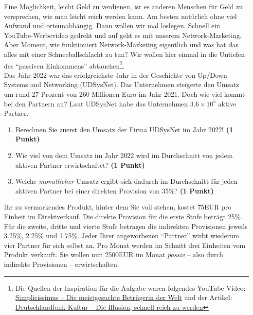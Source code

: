 \documentclass[a4paper, 9pt]{scrartcl}\usepackage[]{graphicx}\usepackage[]{xcolor}
\begin{document}
Eine M{\"o}glichkeit, leicht Geld zu verdienen, ist es anderen Menschen f{\"u}r Geld
zu versprechen, wie man leicht reich werden kann. Am besten nat{\"u}rlich ohne
viel Aufwand und ortsunabh{\"a}ngig. Dann wollen wir mal loslegen. Schnell
ein YouTube-Werbevideo gedreht und auf geht es mit unserem
Network-Marketing. Aber Moment, wie funktioniert Network-Marketing
eigentlich und was hat das alles mit einer Schneeballschlacht zu tun? Wir
wollen hier einmal in die Untiefen des "`passiven Einkommens"'
abtauchen\footnote{Die Quellen der Inspiration f{\"u}r die Aufgabe waren
  folgendes YouTube Video:
  \href{https://youtu.be/UOKkZF_qK9M?si=uf4foJVFKfeQMwSw}{Simplicissimus --
    Die meistgesuchte Betr{\"u}gerin der Welt} und der Artikel:
  \href{https://www.deutschlandfunkkultur.de/netzwerk-marketing-die-illusion-schnell-reich-zu-werden-100.html}{
    Deutschlandfunk Kultur -- Die Illusion, schnell reich zu werden}}.\\

Das Jahr 2022 war das erfolgreichste Jahr in der Geschichte von
Up/Down Systems and Networking (UDSysNet). Das Unternehmen steigerte den Umsatz um rund
27 Prozent von 260 Millionen Euro im Jahr
2021. Doch wie viel kommt bei den Partnern an? Laut
UDSysNet habe das Unternehmen \ensuremath{3.6\times 10^{5}} aktive Partner.

\begin{enumerate}
\item Berechnen Sie zuerst den Umsatz der Firma UDSysNet im
  Jahr 2022! \textbf{(1 Punkt)}
\item Wie viel von dem Umsatz im Jahr 2022 wird im Durchschnitt von jedem
  aktiven Partner erwirtschaftet? \textbf{(1 Punkt)}
\item Welche \textit{monatlicher} Umsatz ergibt sich dadurch im
  Durchschnitt f{\"u}r jeden aktiven Partner bei einer direkten Provision von
  35\%? \textbf{(1 Punkt)}
\end{enumerate}

Ihr zu vermarkendes Produkt, hinter dem Sie voll stehen, kostet
75EUR pro Einheit im Direktverkauf. Die direkte Provision
f{\"u}r die erste Stufe betr{\"a}gt 25\%. F{\"u}r die zweite, dritte und
vierte Stufe betragen die indirekten Provisionen jeweils 3.25\%,
2.25\% und 1.75\%. Jeder Ihrer angeworbenen "`Partner"'
wirbt wiederum vier Partner f{\"u}r sich selbst an. Pro Monat
werden im Schnitt drei Einheiten vom Produkt verkauft. Sie wollen nun
2500EUR im Monat \textit{passiv} -- also durch indirekte
Provisionen -- erwirtschaften.
\end{document}
